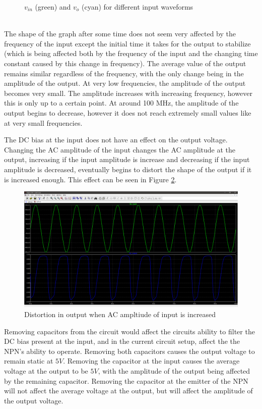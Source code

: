 \documentclass[12pt]{article}
\begin{document}
\begin{enumerate}
\begin{enumerate}
\begin{figure}[h!]
\begin{subfigure}[b]{0.31\textwidth}
            \end{subfigure}
            \caption{$v_{in}$ (green) and $v_o$ (cyan) for different input waveforms}
            \label{fig:SimShapes}
        \end{figure} \\
        The shape of the graph after some time does not seem very affected by the frequency of the input except the initial time it takes for the output to stabilize (which is being affected both by the frequency of the input and the changing time constant caused by this change in frequency). The average value of the output remains similar regardless of the frequency, with the only change being in the amplitude of the output. At very low frequencies, the amplitude of the output becomes very small. The amplitude increases with increasing frequency, however this is only up to a certain point. At around 100 MHz, the amplitude of the output begins to decrease, however it does not reach extremely small values like at very small frequencies.
        
        The DC bias at the input does not have an effect on the output voltage. Changing the AC amplitude of the input changes the AC amplitude at the output, increasing if the input amplitude is increase and decreasing if the input amplitude is decreased, eventually begins to distort the shape of the output if it is increased enough. This effect can be seen in Figure \ref{fig:SimACDist}.
        \begin{figure}[h!]
            \centering
            \includegraphics[width=\textwidth]{SchematicACDistortion}
            \caption{Distortion in output when AC ampltiude of input is increased}
            \label{fig:SimACDist}
        \end{figure}

        Removing capacitors from the circuit would affect the circuits ability to filter the DC bias present at the input, and in the current circuit setup, affect the the NPN's ability to operate. Removing both capacitors causes the output voltage to remain static at $5V$. Removing the capacitor at the input causes the average voltage at the output to be $5V$, with the amplitude of the output being affected by the remaining capacitor. Removing the capacitor at the emitter of the NPN will not affect the average voltage at the output, but will affect the amplitude of the output voltage.
        

\end{enumerate}
\end{enumerate}
\end{document}
